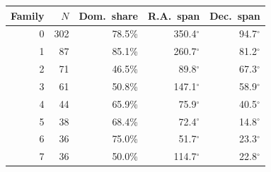 \begin{ruledtabular}
\begin{tabular}{r r r r r}
Family & $N$ & Dom.\ share & R.A.\ span & Dec.\ span \\
\hline
0 & 302 & 78.5\% & 350.4$^\circ$ & 94.7$^\circ$ \\
1 & 87 & 85.1\% & 260.7$^\circ$ & 81.2$^\circ$ \\
2 & 71 & 46.5\% & 89.8$^\circ$ & 67.3$^\circ$ \\
3 & 61 & 50.8\% & 147.1$^\circ$ & 58.9$^\circ$ \\
4 & 44 & 65.9\% & 75.9$^\circ$ & 40.5$^\circ$ \\
5 & 38 & 68.4\% & 72.4$^\circ$ & 14.8$^\circ$ \\
6 & 36 & 75.0\% & 51.7$^\circ$ & 23.3$^\circ$ \\
7 & 36 & 50.0\% & 114.7$^\circ$ & 22.8$^\circ$ \\
\end{tabular}
\end{ruledtabular}
